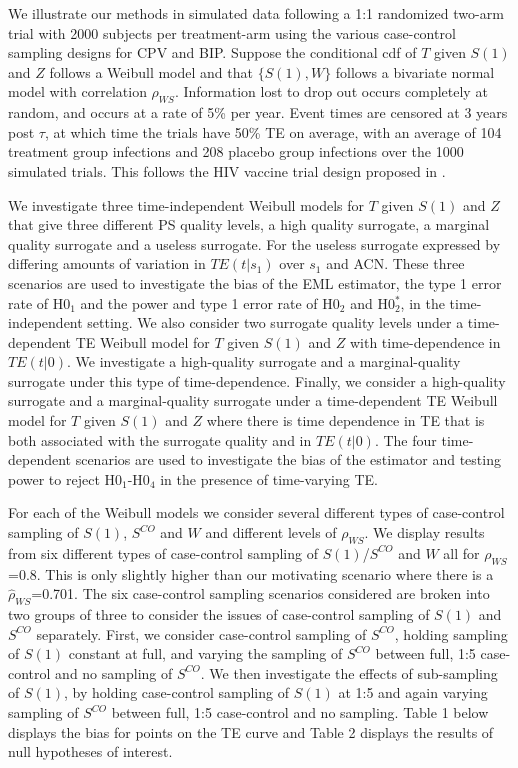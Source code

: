 \documentclass[times, 11pt]{article}
\begin{document}
We illustrate our methods in simulated data following a 1:1 randomized two-arm trial with 2000 subjects per treatment-arm using the various case-control sampling designs for CPV and BIP. Suppose the conditional cdf of $T$ given $S(1)$ and $Z$ follows a Weibull model and that $\{S(1),W\}$ follows a bivariate normal model with correlation $\rho_{WS}$. Information lost to drop out occurs completely at random, and occurs at a rate of 5\% per year. Event times are censored at 3 years post $\tau$, at which time the trials have 50\% TE on average, with an average of 104 treatment group infections and 208 placebo group infections over the 1000 simulated trials. This follows the HIV vaccine trial design proposed in \citet{Gilbert11}.

We investigate three time-independent Weibull models for $T$ given $S(1)$ and $Z$ that give three different PS quality levels, a high quality surrogate, a marginal quality surrogate and a useless surrogate. For the useless surrogate expressed by differing amounts of variation in $TE(t|s_1)$ over $s_1$ and ACN. These three scenarios are used to investigate the bias of the EML estimator, the type 1 error rate of H0$_1$ and the power and type 1 error rate of H0$_2$ and H0$^{*}_2$, in the time-independent setting. We also consider two surrogate quality levels under a time-dependent TE Weibull model for $T$ given $S(1)$ and $Z$ with time-dependence in $TE(t|0)$. We investigate a high-quality surrogate and a marginal-quality surrogate under this type of time-dependence. Finally, we consider a high-quality surrogate and a marginal-quality surrogate under a time-dependent TE Weibull model for $T$ given $S(1)$ and $Z$ where there is time dependence in TE that is both associated with the surrogate quality and in $TE(t|0)$. The four time-dependent scenarios are used to investigate the bias of the estimator and testing power to reject H0$_1$-H0$_4$ in the presence of time-varying TE. 

For each of the Weibull models we consider several different types of case-control sampling of $S(1)$, $S^{CO}$ and $W$ and different levels of $\rho_{WS}$. We display results from six different types of case-control sampling of $S(1)$/$S^{CO}$ and $W$ all for $\rho_{WS}$=0.8. This is only slightly higher than our motivating scenario where there is a $\hat{\rho}_{WS}$=0.701. The six case-control sampling scenarios considered are broken into two groups of three to consider the issues of case-control sampling of $S(1)$ and $S^{CO}$ separately. First, we consider case-control sampling of $S^{CO}$, holding sampling of $S(1)$ constant at full, and varying the sampling of $S^{CO}$ between full, 1:5 case-control and no sampling of $S^{CO}$. We then investigate the effects of sub-sampling of $S(1)$, by holding case-control sampling of $S(1)$ at 1:5 and again varying sampling of $S^{CO}$ between full, 1:5 case-control and no sampling. Table 1 below displays the bias for points on the TE curve and Table 2 displays the results of null hypotheses of interest. 
\end{document}
